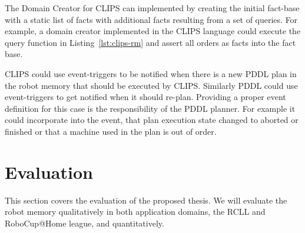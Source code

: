 \documentclass[a4paper,11pt]{article}
\newcommand{\reflst}[1]{Listing~\ref{#1}}
\begin{document}
The Domain Creator for CLIPS can implemented by creating the initial
fact-base with a static list of facts with additional facts resulting
from a set of queries. For example, a domain creator implemented in
the CLIPS language could execute the query function in
\reflst{lst:clips-rm} and assert all orders as facts into the fact
base.

CLIPS could use event-triggers to be notified when there is a new PDDL
plan in the robot memory that should be executed by CLIPS. Similarly
PDDL could use event-triggers to get notified when it should
re-plan. Providing a proper event definition for this case is the
responsibility of the PDDL planner. For example it could incorporate into the
event, that plan execution state changed to aborted or finished or
that a machine used in the plan is out of order.

\section{Evaluation}
\label{sec:eval}
This section covers the evaluation of the proposed thesis. We will
evaluate the robot memory qualitatively in both application domains,
the RCLL and RoboCup@Home league, and quantitatively.
\end{document}
